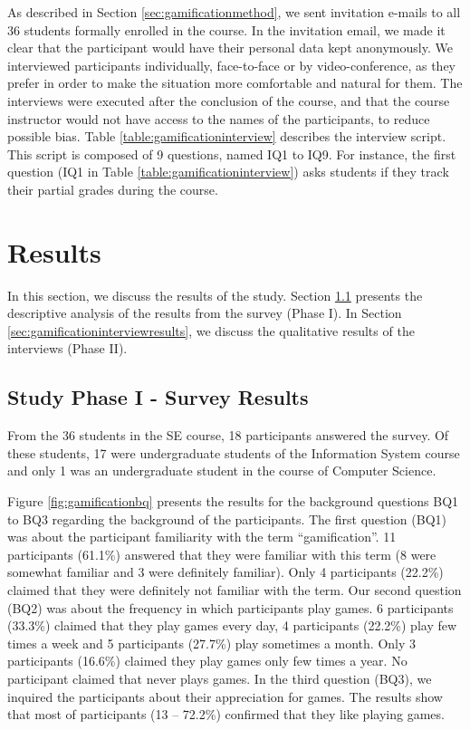 As described in Section \ref{sec:gamificationmethod}, we sent invitation e-mails to all 36 students formally enrolled in the course. In the invitation email, we made it clear that the participant would have their personal data kept anonymously. We interviewed participants individually, face-to-face or by video-conference, as they prefer in order to make the situation more comfortable and natural for them. The interviews were executed after the conclusion of the course, and that the course instructor would not have access to the names of the participants, to reduce possible bias. Table \ref{table:gamificationinterview} describes the interview script. This script is composed of 9 questions, named IQ1 to IQ9. For instance, the first question (IQ1 in Table \ref{table:gamificationinterview}) asks students if they track their partial grades during the course.



\section{Results}
\label{sec:gamificationresults}

In this section, we discuss the results of the study. Section \ref{sec:gamificationsurveyresults} presents the descriptive analysis of the results from the survey (Phase I). In Section \ref{sec:gamificationinterviewresults}, we discuss the qualitative results of the interviews (Phase II).

\subsection{Study Phase I - Survey Results}
\label{sec:gamificationsurveyresults}

From the 36 students in the SE course, 18 participants answered the survey. Of these students, 17 were undergraduate students of the Information System course and only 1 was an undergraduate student in the course of Computer Science. 

Figure \ref{fig:gamificationbq} presents the results for the background questions BQ1 to BQ3 regarding the background of the participants. The first question (BQ1) was about the participant familiarity with the term “gamification”. 11 participants (61.1\%) answered that they were familiar with this term (8 were somewhat familiar and 3 were definitely familiar). Only 4 participants (22.2\%) claimed that they were definitely not familiar with the term. Our second question (BQ2) was about the frequency in which participants play games. 6 participants (33.3\%) claimed that they play games every day, 4 participants (22.2\%) play few times a week and 5 participants (27.7\%) play sometimes a month. Only 3 participants (16.6\%) claimed they play games only few times a year. No participant claimed that never plays games. In the third question (BQ3), we inquired the participants about their appreciation for games. The results show that most of participants (13 – 72.2\%) confirmed that they like playing games.

